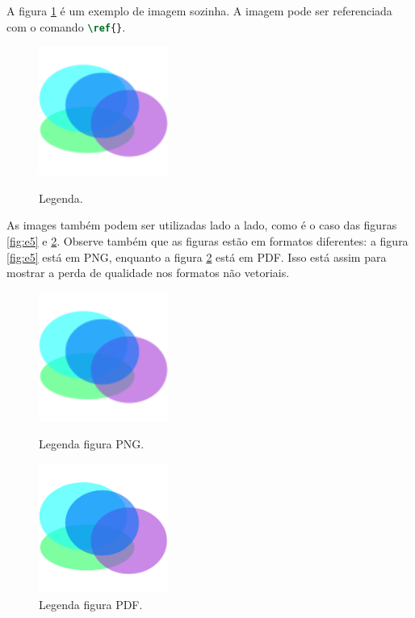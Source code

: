     A figura \ref{fig:e4} é um exemplo de imagem sozinha.
    A imagem pode ser referenciada com o comando \lstinline[language=TeX, style=Code]|\ref{}|.


    \begin{figure}[htb]
        \centering
        \includegraphics[width=120pt]{images/figure.png}
        \caption{Legenda.}
        \label{fig:e4}
    \end{figure}

    As images também podem ser utilizadas lado a lado, como é o caso das figuras \ref{fig:e5} e \ref{fig:e6}.
    Observe também que as figuras estão em formatos diferentes: a figura \ref{fig:e5} está em PNG, enquanto a figura \ref{fig:e6} está em PDF.
    Isso está assim para mostrar a perda de qualidade nos formatos não vetoriais.


    \begin{figure}
        \centering
        \begin{minipage}{0.49\textwidth}
            \centering
            \includegraphics[width=120pt]{images/figure.png}
            \caption{Legenda figura PNG.}
            \label{fig:e5}
        \end{minipage}
        \begin{minipage}{0.49\textwidth}
            \centering
            \includegraphics[width=120pt]{images/figure.pdf}
            \caption{Legenda figura PDF.}
            \label{fig:e6}
        \end{minipage}
    \end{figure}

